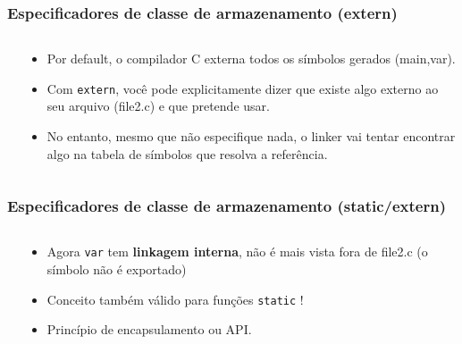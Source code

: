 \documentclass{beamer}
\begin{document}
\begin{frame}
	\frametitle{Especificadores de classe de armazenamento (extern)}
	\begin{columns}[T] %
		\begin{column}{.57\textwidth}
			
						
		\end{column}%
		\hfill%
		\begin{column}{.43\textwidth}
			\begin{itemize}
				\item Por default, o compilador C externa todos os símbolos gerados (main,var).
				\item Com \texttt{extern}, você pode explicitamente dizer que existe algo externo ao seu arquivo (file2.c) e que pretende usar.
			\item No entanto, mesmo que não especifique nada, o linker vai tentar encontrar algo na tabela de símbolos que resolva a referência.
			\end{itemize}
		\end{column}%
	\end{columns}	
\end{frame}

\begin{frame}
	\frametitle{Especificadores de classe de armazenamento (static/extern)}
	\begin{columns}[T] %
		\begin{column}{.57\textwidth}
						
			
			
		\end{column}%
		\hfill%
		\begin{column}{.43\textwidth}
			\begin{itemize}
				\item Agora \texttt{var} tem \textbf{linkagem interna}, não é mais vista fora de file2.c (o símbolo não é exportado)
				\item Conceito também válido para funções \texttt{static} !
				\item Princípio de encapsulamento ou API.
			\end{itemize}
		\end{column}%
	\end{columns}	
\end{frame}
\end{document}
